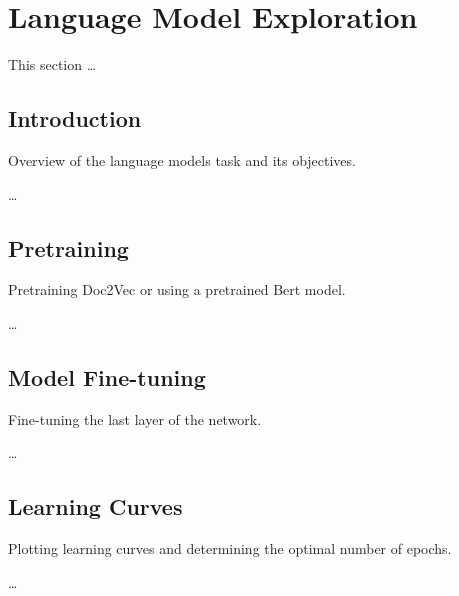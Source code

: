 

\section{Language Model Exploration}

    This section \ldots

    \subsection{Introduction}
    
        Overview of the language models task and its objectives.

        \ldots

    \subsection{Pretraining}
    
        Pretraining Doc2Vec or using a pretrained Bert model.

        \ldots
        
    \subsection{Model Fine-tuning}
    
        Fine-tuning the last layer of the network.

        \ldots
        
    \subsection{Learning Curves}
    
        Plotting learning curves and determining the optimal number of epochs.

        \ldots

